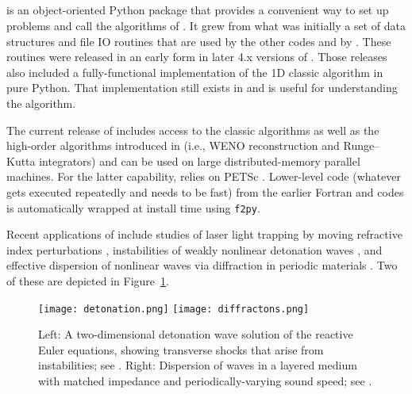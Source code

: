 %
%
%

\subsection{\pyclaw} \label{sec:pyclaw}
\pyclaw is an object-oriented Python package that provides a convenient way
to set up problems and call the algorithms of \clawpack.  It grew
from what was initially a set of data structures and file IO routines that are
used by the other \clawpack codes and by \visclaw.  These routines were released in
an early form in later 4.x versions of \clawpack.  Those releases also
included a fully-functional implementation of the 1D classic algorithm
in pure Python. That implementation still exists in \pyclaw and is useful
for understanding the algorithm.

The current release of \pyclaw includes access to the classic algorithms as well
as the high-order algorithms introduced in \sharpclaw \cite{2013_sharpclaw} (i.e., WENO
reconstruction and Runge--Kutta integrators) and can be used on large
distributed-memory parallel machines.  For the latter capability, \pyclaw
relies on PETSc \cite{petsc-user-ref, ketcheson2012pyclaw}.
Lower-level code (whatever gets executed
repeatedly and needs to be fast) from the earlier Fortran \classic and \sharpclaw
codes is automatically wrapped at install time using \texttt{f2py}.

Recent applications of \pyclaw include studies of laser light trapping by moving
refractive index perturbations \cite{sanroman_thesis}, instabilities of weakly nonlinear detonation
waves \cite{faria2015qualitative}, and effective dispersion of nonlinear waves via diffraction in
periodic materials \cite{2015_diffractons}.  Two of these are depicted in
Figure~\ref{fig:pyclaw-apps}.

\begin{figure}
\hfil\texttt{[image: detonation.png]}
\hskip 5pt
\hfil\texttt{[image: diffractons.png]}
\hskip 5pt
\caption{\label{fig:pyclaw-apps}
Left: A two-dimensional detonation wave solution of the reactive Euler equations,
showing transverse shocks that arise from instabilities; see \cite{faria2015qualitative}.
Right: Dispersion of waves in a layered medium with matched impedance and periodically-varying
sound speed; see \cite{2015_diffractons}.}
\end{figure}


